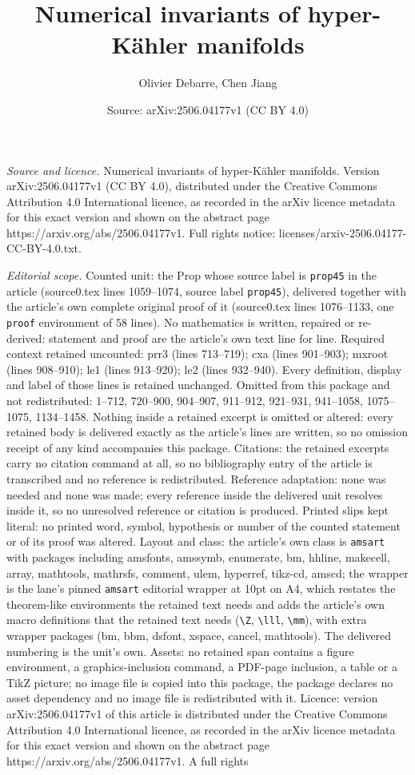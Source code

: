 \documentclass[10pt,a4paper]{amsart}
\title[Numerical invariants of hyper-K\"ahler manifolds]{Numerical invariants of hyper-K\"ahler manifolds}
\author{Olivier Debarre, Chen Jiang}
\date{Source: arXiv:2506.04177v1 (CC BY 4.0)}
\begin{document}
\maketitle

\noindent\emph{Source and licence.} Numerical invariants of hyper-K\"ahler manifolds. Version arXiv:2506.04177v1 (CC BY 4.0), distributed under the Creative Commons Attribution 4.0 International licence, as recorded in the arXiv licence metadata for this exact version and shown on the abstract page https://arxiv.org/abs/2506.04177v1. Full rights notice: licenses/arxiv-2506.04177-CC-BY-4.0.txt.\par\smallskip

\noindent\textit{Editorial scope.} Counted unit: the Prop whose source label is \texttt{prop45} in the article (source0.tex lines 1059--1074, source label \texttt{prop45}), delivered together with the article's own complete original proof of it (source0.tex lines 1076--1133, one \texttt{proof} environment of 58 lines). No mathematics is written, repaired or re-derived: statement and proof are the article's own text line for line. Required context retained uncounted: prr3 (lines 713--719); cxa (lines 901--903); mxroot (lines 908--910); le1 (lines 913--920); le2 (lines 932--940). Every definition, display and label of those lines is retained unchanged. Omitted from this package and not redistributed: 1--712, 720--900, 904--907, 911--912, 921--931, 941--1058, 1075--1075, 1134--1458. Nothing inside a retained excerpt is omitted or altered: every retained body is delivered exactly as the article's lines are written, so no omission receipt of any kind accompanies this package. Citations: the retained excerpts carry no citation command at all, so no bibliography entry of the article is transcribed and no reference is redistributed. Reference adaptation: none was needed and none was made; every reference inside the delivered unit resolves inside it, so no unresolved reference or citation is produced. Printed slips kept literal: no printed word, symbol, hypothesis or number of the counted statement or of its proof was altered. Layout and class: the article's own class is \texttt{amsart} with packages including amsfonts, amssymb, enumerate, bm, hhline, makecell, array, mathtools, mathrsfs, comment, ulem, hyperref, tikz-cd, amscd; the wrapper is the lane's pinned \texttt{amsart} editorial wrapper at 10pt on A4, which restates the theorem-like environments the retained text needs and adds the article's own macro definitions that the retained text needs (\texttt{\textbackslash Z}, \texttt{\textbackslash lll}, \texttt{\textbackslash mm}), with extra wrapper packages (bm, bbm, dsfont, xspace, cancel, mathtools). The delivered numbering is the unit's own. Assets: no retained span contains a figure environment, a graphics-inclusion command, a PDF-page inclusion, a table or a TikZ picture; no image file is copied into this package, the package declares no asset dependency and no image file is redistributed with it. Licence: version arXiv:2506.04177v1 of this article is distributed under the Creative Commons Attribution 4.0 International licence, as recorded in the arXiv licence metadata for this exact version and shown on the abstract page https://arxiv.org/abs/2506.04177v1. A full rights 
\end{document}
